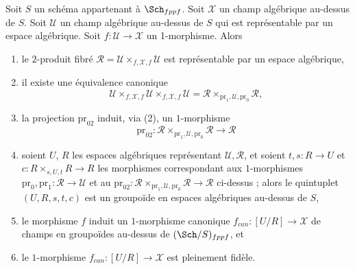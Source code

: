\begin{lemma}
\label{lemma-map-space-into-stack}
Soit $S$ un schéma appartenant à $\Sch_{fppf}$.
Soit $\mathcal{X}$ un champ algébrique au-dessus de $S$.
Soit $\mathcal{U}$ un champ algébrique au-dessus de $S$ qui
est représentable par un espace algébrique.
Soit $f : \mathcal{U} \to \mathcal{X}$ un 1-morphisme. Alors
\begin{enumerate}
\item le $2$-produit fibré
$\mathcal{R} = \mathcal{U} \times_{f, \mathcal{X}, f} \mathcal{U}$
est représentable par un espace algébrique,
\item il existe une équivalence canonique
$$
\mathcal{U} \times_{f, \mathcal{X}, f} \mathcal{U}
\times_{f, \mathcal{X}, f} \mathcal{U} =
\mathcal{R} \times_{\text{pr}_1, \mathcal{U}, \text{pr}_0} \mathcal{R},
$$
\item la projection $\text{pr}_{02}$ induit, via (2), un $1$-morphisme
$$
\text{pr}_{02} :
\mathcal{R} \times_{\text{pr}_1, \mathcal{U}, \text{pr}_0} \mathcal{R}
\longrightarrow
\mathcal{R}
$$
\item soient $U$, $R$ les espaces algébriques représentant
$\mathcal{U}, \mathcal{R}$, et soient $t, s : R \to U$ et
$c : R \times_{s, U, t} R \to R$ les morphismes correspondant
aux $1$-morphismes
$\text{pr}_0, \text{pr}_1 : \mathcal{R} \to \mathcal{U}$
et au
$\text{pr}_{02} :
\mathcal{R} \times_{\text{pr}_1, \mathcal{U}, \text{pr}_0} \mathcal{R} \to
\mathcal{R}$ ci-dessus ; alors le quintuplet $(U, R, s, t, c)$ est un groupoïde en
espaces algébriques au-dessus de $S$,
\item le morphisme $f$ induit un $1$-morphisme canonique
$f_{can} : [U/R] \to \mathcal{X}$
de champs en groupoïdes au-dessus de $(\Sch/S)_{fppf}$, et
\item le $1$-morphisme $f_{can} : [U/R] \to \mathcal{X}$ est pleinement fidèle.
\end{enumerate}
\end{lemma}

